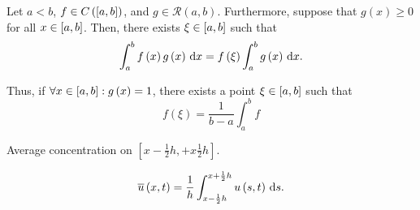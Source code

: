 \begin{frame}
    \begin{theorem}
        Let $a<b$,
        \begin{math}
            f\in
            C\left(\left[a,b\right]\right)
        \end{math},
        and
        \begin{math}
            g\in
            \mathcal{R}\left(a,b\right)
        \end{math}.
        Furthermore, suppose that $g\left(x\right)\geq0$ for all
        $x\in\left[a,b\right]$.
        Then, there exists $\xi\in\left[a,b\right]$ such that
        \begin{equation*}
            \int_{a}^{b}
            f\left(x\right)
            g\left(x\right)
            \dl x=
            f\left(\xi\right)
            \int_{a}^{b}
            g\left(x\right)
            \dl x.
        \end{equation*}

        Thus, if
        \begin{math}
            \forall x\in
            \left[a,b\right]:
            g\left(x\right)=
            1
        \end{math},
        there exists a point $\xi\in\left[a,b\right]$ such that
        \begin{equation*}
            f\left(\xi\right)=
            \dfrac{1}{b-a}
            \int_{a}^{b}
            f
        \end{equation*}
    \end{theorem}

    \begin{definition}
        Average concentration on
        \begin{math}
            \left[
                x-\frac{1}{2}h,
                +x\frac{1}{2}h
                \right]
        \end{math}.

        \begin{equation*}
            \overline{u}
            \left(x,t\right)=
            \dfrac{1}{h}
            \int_{x-\frac{1}{2}h}^{x+\frac{1}{2}h}
            u\left(s,t\right)
            \dl s.
        \end{equation*}
    \end{definition}
\end{frame}

